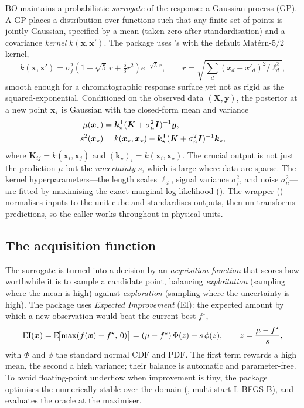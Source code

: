 BO maintains a probabilistic \emph{surrogate} of the response: a Gaussian process
(GP). A GP places a distribution over functions such that any finite set of
points is jointly Gaussian, specified by a mean (taken zero after
standardisation) and a covariance \emph{kernel} $k(\bm x,\bm x')$. The package
uses 's  with the default Mat\'ern-$5/2$ kernel,
%
\begin{equation}
k(\bm x,\bm x') = \sigma_f^2
\left(1 + \sqrt5\,r + \tfrac{5}{3} r^2\right)
e^{-\sqrt5\, r},
\qquad
r = \sqrt{\textstyle\sum_d (x_d-x'_d)^2/\ell_d^2},
\end{equation}
%
smooth enough for a chromatographic response surface yet not as rigid as the
squared-exponential. Conditioned on the observed data
$(\bm X,\bm y)$, the posterior at a new point $\bm x_\star$ is Gaussian with the
closed-form mean and variance
%
\begin{align}
\mu(\bm x_\star) &= \bm k_\star^{\mathsf{T}} (\bm K + \sigma_n^2 \bm I)^{-1}\bm y, \\
s^2(\bm x_\star) &= k(\bm x_\star,\bm x_\star)
  - \bm k_\star^{\mathsf{T}} (\bm K + \sigma_n^2 \bm I)^{-1}\bm k_\star,
\end{align}
%
where $\bm K_{ij}=k(\bm x_i,\bm x_j)$ and $(\bm k_\star)_i = k(\bm x_i,\bm
x_\star)$. The crucial output is not just the prediction $\mu$ but the
\emph{uncertainty} $s$, which is large where data are sparse. The kernel
hyperparameters---the length scales $\ell_d$, signal variance $\sigma_f^2$, and
noise $\sigma_n^2$---are fitted by maximising the exact marginal log-likelihood
(). The wrapper () normalises inputs to
the unit cube and standardises outputs, then un-transforms predictions, so the
caller works throughout in physical units.

\subsection{The acquisition function}

The surrogate is turned into a decision by an \emph{acquisition function} that
scores how worthwhile it is to sample a candidate point, balancing
\emph{exploitation} (sampling where the mean is high) against \emph{exploration}
(sampling where the uncertainty is high). The package uses \emph{Expected
Improvement} (EI): the expected amount by which a new observation would beat the
current best $f^\star$,
%
\begin{equation}
\mathrm{EI}(\bm x) = \mathbb{E}\!\bigl[\max(f(\bm x)-f^\star,\,0)\bigr]
= (\mu-f^\star)\,\Phi(z) + s\,\phi(z),
\qquad z = \frac{\mu-f^\star}{s},
\label{eq:ei}
\end{equation}
%
with $\Phi$ and $\phi$ the standard normal CDF and PDF. The first term rewards a
high mean, the second a high variance; their balance is automatic and
parameter-free. To avoid floating-point underflow when improvement is tiny, the
package optimises the numerically stable  over the
domain (, multi-start L-BFGS-B), and evaluates the oracle at
the maximiser.

